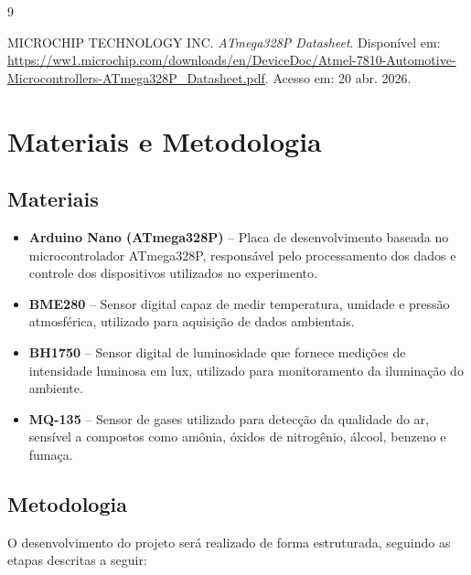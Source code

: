 \documentclass[a4paper,12pt]{article}
\begin{document}
\begin{thebibliography}{9}

MICROCHIP TECHNOLOGY INC. \textit{ATmega328P Datasheet}. Disponível em: \url{https://ww1.microchip.com/downloads/en/DeviceDoc/Atmel-7810-Automotive-Microcontrollers-ATmega328P_Datasheet.pdf}. Acesso em: 20 abr. 2026.

\end{thebibliography}

\section{Materiais e Metodologia}

\subsection{Materiais}

\begin{itemize}
    \item \textbf{Arduino Nano (ATmega328P)} -- Placa de desenvolvimento baseada no microcontrolador ATmega328P, responsável pelo processamento dos dados e controle dos dispositivos utilizados no experimento.
    
    \item \textbf{BME280} -- Sensor digital capaz de medir temperatura, umidade e pressão atmosférica, utilizado para aquisição de dados ambientais.
    
    \item \textbf{BH1750} -- Sensor digital de luminosidade que fornece medições de intensidade luminosa em lux, utilizado para monitoramento da iluminação do ambiente.
    
    \item \textbf{MQ-135} -- Sensor de gases utilizado para detecção da qualidade do ar, sensível a compostos como amônia, óxidos de nitrogênio, álcool, benzeno e fumaça.
\end{itemize}

\subsection{Metodologia}
O desenvolvimento do projeto será realizado de forma estruturada, seguindo as etapas descritas a seguir:
\end{document}
